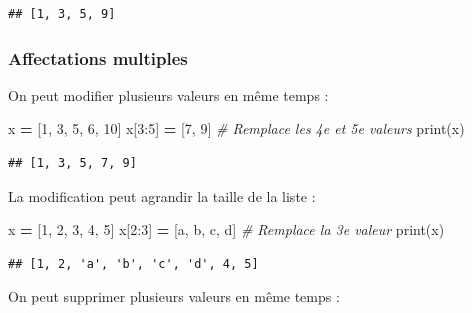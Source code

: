 \documentclass[
  12pt,
]{book}
\newenvironment{Shaded}{\begin{snugshade}}{\end{snugshade}}
\newcommand{\BuiltInTok}[1]{#1}
\newcommand{\CommentTok}[1]{\textcolor[rgb]{0.56,0.35,0.01}{\textit{#1}}}
\newcommand{\DecValTok}[1]{\textcolor[rgb]{0.00,0.00,0.81}{#1}}
\newcommand{\NormalTok}[1]{#1}
\newcommand{\OperatorTok}[1]{\textcolor[rgb]{0.81,0.36,0.00}{\textbf{#1}}}
\newcommand{\StringTok}[1]{\textcolor[rgb]{0.31,0.60,0.02}{#1}}
\numberwithin{equation}{section}
\numberwithin{countremarque}{section}
\begin{document}
\begin{lstlisting}
## [1, 3, 5, 9]
\end{lstlisting}

\subsubsection{Affectations multiples}\label{affectations-multiples}

On peut modifier plusieurs valeurs en même temps :

\begin{Shaded}
\begin{Highlighting}[]
\NormalTok{x }\OperatorTok{=}\NormalTok{ [}\DecValTok{1}\NormalTok{, }\DecValTok{3}\NormalTok{, }\DecValTok{5}\NormalTok{, }\DecValTok{6}\NormalTok{, }\DecValTok{10}\NormalTok{]}
\NormalTok{x[}\DecValTok{3}\NormalTok{:}\DecValTok{5}\NormalTok{] }\OperatorTok{=}\NormalTok{ [}\DecValTok{7}\NormalTok{, }\DecValTok{9}\NormalTok{] }\CommentTok{\# Remplace les 4e et 5e valeurs}
\BuiltInTok{print}\NormalTok{(x)}
\end{Highlighting}
\end{Shaded}

\begin{lstlisting}
## [1, 3, 5, 7, 9]
\end{lstlisting}

La modification peut agrandir la taille de la liste :

\begin{Shaded}
\begin{Highlighting}[]
\NormalTok{x }\OperatorTok{=}\NormalTok{ [}\DecValTok{1}\NormalTok{, }\DecValTok{2}\NormalTok{, }\DecValTok{3}\NormalTok{, }\DecValTok{4}\NormalTok{, }\DecValTok{5}\NormalTok{]}
\NormalTok{x[}\DecValTok{2}\NormalTok{:}\DecValTok{3}\NormalTok{] }\OperatorTok{=}\NormalTok{ [}\StringTok{\textquotesingle{}a\textquotesingle{}}\NormalTok{, }\StringTok{\textquotesingle{}b\textquotesingle{}}\NormalTok{, }\StringTok{\textquotesingle{}c\textquotesingle{}}\NormalTok{, }\StringTok{\textquotesingle{}d\textquotesingle{}}\NormalTok{] }\CommentTok{\# Remplace la 3e valeur}
\BuiltInTok{print}\NormalTok{(x)}
\end{Highlighting}
\end{Shaded}

\begin{lstlisting}
## [1, 2, 'a', 'b', 'c', 'd', 4, 5]
\end{lstlisting}

On peut supprimer plusieurs valeurs en même temps :
\end{document}
